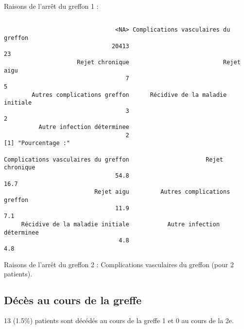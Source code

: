 \documentclass[11pt,a4paper]{article}\usepackage[]{graphicx}\usepackage[]{color}
\makeatletter
\newenvironment{kframe}{%
 \def\at@end@of@kframe{}%
 \ifinner\ifhmode%
  \def\at@end@of@kframe{\end{minipage}}%
  \begin{minipage}{\columnwidth}%
 \fi\fi%
 \def\FrameCommand##1{\hskip\@totalleftmargin \hskip-\fboxsep
 \colorbox{shadecolor}{##1}\hskip-\fboxsep
     \hskip-\linewidth \hskip-\@totalleftmargin \hskip\columnwidth}%
 \MakeFramed {\advance\hsize-\width
   \@totalleftmargin\z@ \linewidth\hsize
   \@setminipage}}%
 {\par\unskip\endMakeFramed%
 \at@end@of@kframe}
\newenvironment{knitrout}{}{} %
\makeatother
\begin{document}
Raisons de l'arrêt du greffon 1 :
\begin{knitrout}
\color{fgcolor}\begin{kframe}
\begin{verbatim}

                                <NA> Complications vasculaires du greffon 
                               20413                                   23 
                     Rejet chronique                           Rejet aigu 
                                   7                                    5 
        Autres complications greffon      Récidive de la maladie initiale 
                                   3                                    2 
          Autre infection déterminee 
                                   2 
[1] "Pourcentage :"

Complications vasculaires du greffon                      Rejet chronique 
                                54.8                                 16.7 
                          Rejet aigu         Autres complications greffon 
                                11.9                                  7.1 
     Récidive de la maladie initiale           Autre infection déterminee 
                                 4.8                                  4.8 
\end{verbatim}
\end{kframe}
\end{knitrout}

Raisons de l'arrêt du greffon 2 : Complications vasculaires du greffon  (pour 2 patients).

  \subsection{Décès au cours de la greffe}

13 (1.5\%) patients sont décédés au cours de la greffe 1 et 0 au cours de la 2e.
\end{document}
